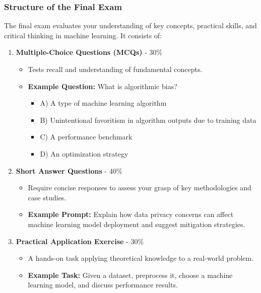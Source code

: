 \documentclass[aspectratio=169]{beamer}
\begin{document}
\begin{frame}[fragile]
    \frametitle{Structure of the Final Exam}
    The final exam evaluates your understanding of key concepts, practical skills, and critical thinking in machine learning. It consists of:
    \begin{enumerate}
        \item \textbf{Multiple-Choice Questions (MCQs)} - 30\%
        \begin{itemize}
            \item Tests recall and understanding of fundamental concepts.
            \item \textbf{Example Question:} What is algorithmic bias?
            \begin{itemize}
                \item A) A type of machine learning algorithm
                \item B) Unintentional favoritism in algorithm outputs due to training data
                \item C) A performance benchmark
                \item D) An optimization strategy
            \end{itemize}
        \end{itemize}
        
        \item \textbf{Short Answer Questions} - 40\%
        \begin{itemize}
            \item Require concise responses to assess your grasp of key methodologies and case studies.
            \item \textbf{Example Prompt:} Explain how data privacy concerns can affect machine learning model deployment and suggest mitigation strategies.
        \end{itemize}
        
        \item \textbf{Practical Application Exercise} - 30\%
        \begin{itemize}
            \item A hands-on task applying theoretical knowledge to a real-world problem.
            \item \textbf{Example Task:} Given a dataset, preprocess it, choose a machine learning model, and discuss performance results.
        \end{itemize}
    \end{enumerate}
\end{frame}
\end{document}
